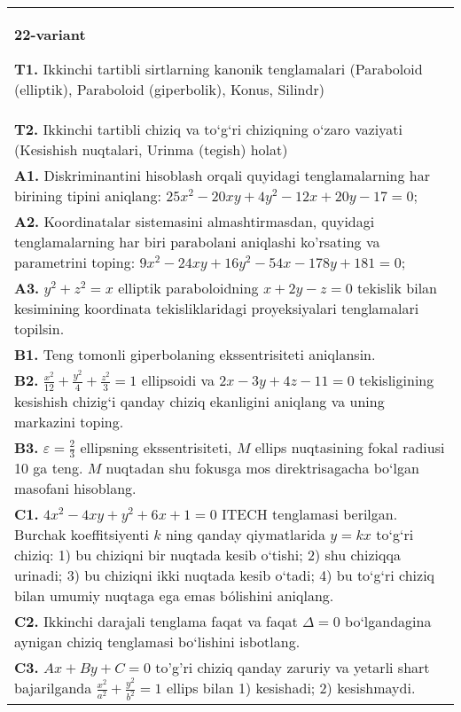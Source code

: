 \documentclass{article}
\begin{document}
\begin{tabular}{m{17cm}}
\textbf{22-variant}
\newline

\textbf{T1.} Ikkinchi tartibli sirtlarning kanonik tenglamalari (Paraboloid (elliptik), Paraboloid (giperbolik), Konus, Silindr) \\
\textbf{T2.} Ikkinchi tartibli chiziq va to‘g‘ri chiziqning o‘zaro vaziyati (Kesishish nuqtalari, Urinma (tegish) holat) \\
\textbf{A1.} Diskriminantini hisoblash orqali quyidagi tenglamalarning har birining tipini aniqlang: $25 x^2-20 x y+4 y^2-12 x+20 y-17=0$; \\
\textbf{A2.} Koordinatalar sistemasini almashtirmasdan, quyidagi tenglamalarning har biri parabolani aniqlashi ko'rsating va parametrini toping: $9 x^2-24 x y+16 y^2-54 x-178 y+181=0$; \\
\textbf{A3.} $y^2+z^2=x$ elliptik paraboloidning $x+2 y-z=0$ tekislik bilan kesimining koordinata tekisliklaridagi proyeksiyalari tenglamalari topilsin. \\
\textbf{B1.} Teng tomonli giperbolaning ekssentrisiteti aniqlansin. \\
\textbf{B2.} $\frac{x^2}{12}+\frac{y^2}{4}+\frac{z^2}{3}=1$ ellipsoidi va $2x-3y+4z-11=0$ tekisligining kesishish chizig‘i qanday chiziq ekanligini aniqlang va uning markazini toping. \\
\textbf{B3.} $\varepsilon=\frac{2}{3}$ ellipsning ekssentrisiteti, $M$ ellips nuqtasining fokal radiusi 10 ga teng. $M$ nuqtadan shu fokusga mos direktrisagacha bo‘lgan masofani hisoblang. \\
\textbf{C1.} $4 x^2-4 x y+y^2+6 x+1=0$ ITECH tenglamasi berilgan. Burchak koeffitsiyenti $k$ ning qanday qiymatlarida $y=kx$ to‘g‘ri chiziq: 1) bu chiziqni bir nuqtada kesib o‘tishi; 2) shu chiziqqa urinadi; 3) bu chiziqni ikki nuqtada kesib o‘tadi; 4) bu to‘g‘ri chiziq bilan umumiy nuqtaga ega emas bólishini aniqlang. \\
\textbf{C2.} Ikkinchi darajali tenglama faqat va faqat $\Delta=0$ bo‘lgandagina aynigan chiziq tenglamasi bo‘lishini isbotlang. \\
\textbf{C3.} $A x+B y+C=0$ to'g'ri chiziq qanday zaruriy va yetarli shart bajarilganda $\frac{x^2}{a^2}+\frac{y^2}{b^2}=1$ ellips bilan 1) kesishadi; 2) kesishmaydi. \\

\end{tabular}
\vspace{1cm}
\end{document}
